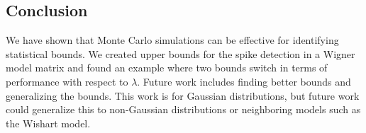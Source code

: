 \documentclass{article}
\begin{document}
\subsection*{Conclusion}
We have shown that Monte Carlo simulations can be effective for identifying statistical bounds. We created upper bounds for the spike detection in a Wigner model matrix and found an example where two bounds switch in terms of performance with respect to $\lambda$. Future work includes finding better bounds and generalizing the bounds. This work is for Gaussian distributions, but future work could generalize this to non-Gaussian distributions or neighboring models such as the Wishart model.




\end{document}
